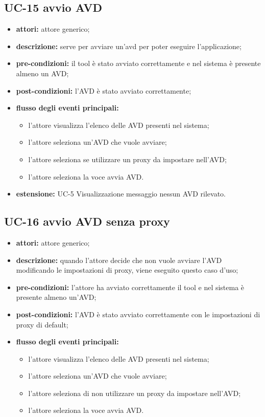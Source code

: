 \subsection*{UC-15 avvio AVD}\label{subsec:uc-15-avvio-avd}
\begin{itemize}
    \item \textbf{attori:} attore generico;
    \item \textbf{descrizione:} serve per avviare un'avd per poter eseguire l'applicazione;
    \item \textbf{pre-condizioni:} il tool è stato avviato correttamente e nel sistema è presente almeno un AVD;
    \item \textbf{post-condizioni:} l'AVD è stato avviato correttamente;
    \item \textbf{flusso degli eventi principali:}
    \begin{itemize}
        \item l'attore visualizza l'elenco delle AVD presenti nel sistema;
        \item l'attore seleziona un'AVD che vuole avviare;
        \item l'attore seleziona se utilizzare un proxy da impostare nell'AVD;
        \item l'attore seleziona la voce avvia AVD.
    \end{itemize}
    \item \textbf{estensione:} UC-5 Visualizzazione messaggio nessun AVD rilevato.
\end{itemize}
\subsection*{UC-16 avvio AVD senza proxy}\label{subsec:uc-16-avvio-avd-senza-proxy}
\begin{itemize}
    \item \textbf{attori:} attore generico;
    \item \textbf{descrizione:} quando l'attore decide che non vuole avviare l'AVD modificando le impostazioni di proxy, viene eseguito questo caso d'uso;
    \item \textbf{pre-condizioni:} l'attore ha avviato correttamente il tool e nel sistema è presente almeno un'AVD;
    \item \textbf{post-condizioni:} l'AVD è stato avviato correttamente con le impostazioni di proxy di default;
    \item \textbf{flusso degli eventi principali:}
    \begin{itemize}
        \item l'attore visualizza l'elenco delle AVD presenti nel sistema;
        \item l'attore seleziona un'AVD che vuole avviare;
        \item l'attore seleziona di non utilizzare un proxy da impostare nell'AVD;
        \item l'attore seleziona la voce avvia AVD.
    \end{itemize}
\end{itemize}
